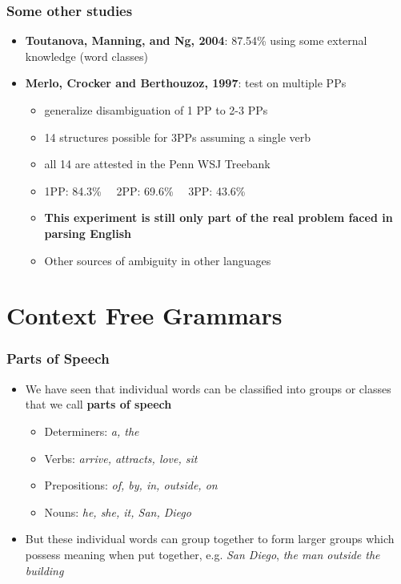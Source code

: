 \begin{frame}
\frametitle{Some other studies}
  \begin{itemize}
  \item {\bf Toutanova, Manning, and Ng, 2004}: 87.54\% using some external knowledge (word classes)
  \item {\bf Merlo, Crocker and Berthouzoz, 1997}: test on multiple PPs
  \begin{itemize}
	\item generalize disambiguation of 1 PP to 2-3 PPs
	\item 14 structures possible for 3PPs assuming a single verb
	\item all 14 are attested in the Penn WSJ Treebank
	\item 1PP: 84.3\% \ \ 2PP: 69.6\% \ \ 3PP: 43.6\% 
	\item {\bf This experiment is still only part of the real problem faced in parsing English}
	\item Other sources of ambiguity in other languages
  \end{itemize}
  \end{itemize}

\end{frame}

\section{Context Free Grammars}
\begin{frame}
\frametitle{Parts of Speech}
\begin{itemize}
\item We have seen that individual words can be classified into groups
  or classes that we call {\bf parts of speech}
\begin{itemize}
\item Determiners: {\em a, the}
\item Verbs: {\em arrive, attracts, love, sit}
\item Prepositions: {\em of, by, in, outside, on}
\item Nouns: {\em he, she, it, San, Diego}
\end{itemize}
\item But these individual words can group together to form larger
  groups which possess meaning when put together, e.g. {\em San
  Diego}, {\em the man outside the building}
\end{itemize}

\end{frame}

